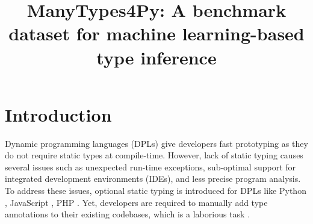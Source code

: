 \documentclass[10pt, conference]{IEEEtran}
\begin{document}
\title{ManyTypes4Py: A benchmark dataset for machine learning-based type inference\\
}

\author{
\and
{}
\and
{}
}

\maketitle

\begin{abstract}

\end{abstract}

\begin{IEEEkeywords}
\end{IEEEkeywords}

\section{Introduction}
Dynamic programming languages (DPLs) give developers fast prototyping as they do not require static types at compile-time. However, lack of static typing causes several issues such as unexpected run-time exceptions, sub-optimal support for integrated development environments (IDEs), and less precise program analysis. To address these issues, optional static typing is introduced for DPLs like Python \cite{van2014pep}, JavaScript \cite{bierman2014understanding}, PHP \cite{klingstrom2020type}. Yet, developers are required to manually add type annotations to their existing codebases, which is a laborious task \cite{ore2018assessing}.
\end{document}
